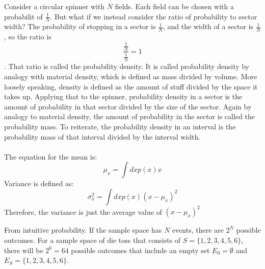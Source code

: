\documentclass{article}
\begin{document}
Consider a circular spinner with $N$ fields. Each field can be chosen with a probabilit of $\frac{1}{N}$. But what if we instead consider the ratio of probability to sector width? The probability
of stopping in a sector is $\frac{1}{N}$, and the width of a sector is $\frac{1}{N}$, so the ratio is 
\begin{equation}
\frac{ \frac{1}{N} }{ \frac{1}{N} } = 1
\end{equation}. 
That ratio is called the probability density. It is called probability density by analogy with material density, which is defined as mass divided by volume. More loosely speaking, density is defined as the amount of stuff divided by the space it takes up. Applying that to the spinner, probability density in a sector is the amount of probability in that sector divided by the size of the sector. Again by analogy to material density, the amount of probability in the sector is called the probability mass. To reiterate, the probability density in an interval is the probability mass of that interval divided by the interval width.
\\
\\
The equation for the mean is:
\begin{equation}
\mu_x = \int dx p(x)x
\end{equation}
Variance is defined as:
\begin{equation}
\sigma_{x}^{2} = \int dx p(x)(x- \mu_x)^2
\end{equation}
Therefore, the variance is just the average value of $(x- \mu_x)^2$


From intuitive probability. If the sample space has $N$ events, there are $2^N$ possible outcomes. For a sample space of die toss that consists of $S=\{1,2,3,4,5,6\}$, there will be $2^6=64$ possible outcomes that include an empty set $E_0=\emptyset$ and $E_S=\{1,2,3,4,5,6\}$.
\end{document}
